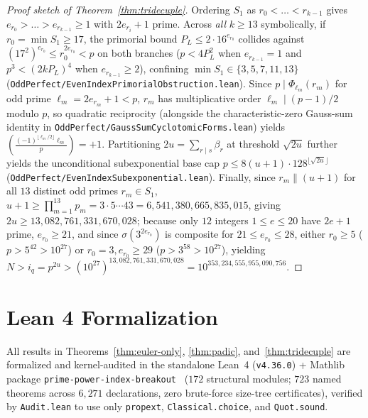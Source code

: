 \documentclass[11pt]{amsart}
\theoremstyle{definition}
\theoremstyle{remark}
\begin{document}
\begin{proof}[Proof sketch of Theorem~\ref{thm:tridecuple}]
Ordering $S_1$ as $r_0 < \dots < r_{k-1}$ gives $e_{r_0} > \dots > e_{r_{k-1}} \ge 1$ with $2 e_{r_i} + 1$ prime. Across \emph{all} $k \ge 13$ symbolically, if $r_0 = \min S_1 \ge 17$, the primorial bound $P_L \le 2 \cdot 16^{e_{r_0}}$ collides against $(17^2)^{e_{r_0}} \le r_0^{2 e_{r_0}} < p$ on both branches ($p < 4 P_L^2$ when $e_{r_{k-1}} = 1$ and $p^3 < (2 k P_L)^4$ when $e_{r_{k-1}} \ge 2$), confining $\min S_1 \in \{3, 5, 7, 11, 13\}$ (\texttt{OddPerfect/EvenIndexPrimorialObstruction.lean}). Since $p \mid \Phi_{\ell_m}(r_m)$ for odd prime $\ell_m = 2 e_{r_m} + 1 < p$, $r_m$ has multiplicative order $\ell_m \mid (p - 1)/2$ modulo $p$, so quadratic reciprocity (alongside the characteristic-zero Gauss-sum identity in \texttt{OddPerfect/GaussSumCyclotomicForms.lean}) yields $\left(\frac{(-1)^{\lfloor \ell_m / 2 \rfloor}\ell_m}{p}\right) = +1$. Partitioning $2u = \sum_{r \mid s} \beta_r$ at threshold $\sqrt{2u}$ further yields the unconditional subexponential base cap $p \le 8(u + 1)\cdot 128^{\lfloor \sqrt{2u} \rfloor}$ (\texttt{OddPerfect/EvenIndexSubexponential.lean}). Finally, since $r_m \parallel (u + 1)$ for all $13$ distinct odd primes $r_m \in S_1$, $u + 1 \ge \prod_{m=1}^{13} p_m = 3 \cdot 5 \cdots 43 = 6{,}541{,}380{,}665{,}835{,}015$, giving $2u \ge 13{,}082{,}761{,}331{,}670{,}028$; because only $12$ integers $1 \le e \le 20$ have $2e + 1$ prime, $e_{r_0} \ge 21$, and since $\sigma(3^{2 e_{r_0}})$ is composite for $21 \le e_{r_0} \le 28$, either $r_0 \ge 5$ ($p > 5^{42} > 10^{27}$) or $r_0 = 3, e_{r_0} \ge 29$ ($p > 3^{58} > 10^{27}$), yielding $N > i_q = p^{2u} > (10^{27})^{13{,}082{,}761{,}331{,}670{,}028} = 10^{353{,}234{,}555{,}955{,}090{,}756}$.
\end{proof}

\section{Lean 4 Formalization}

All results in Theorems~\ref{thm:euler-only}, \ref{thm:padic}, and~\ref{thm:tridecuple} are formalized and kernel-audited in the standalone Lean~4 (\texttt{v4.36.0}) + Mathlib package \texttt{prime-power-index-breakout}~\cite{HamiltonPrimePower} ($172$ structural modules; $723$ named theorems across $6{,}271$ declarations, zero brute-force size-tree certificates), verified by \texttt{Audit.lean} to use only \texttt{propext}, \texttt{Classical.choice}, and \texttt{Quot.sound}.
\end{document}
